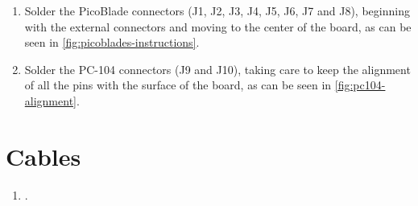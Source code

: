 \begin{enumerate}
    \item Solder the PicoBlade connectors (J1, J2, J3, J4, J5, J6, J7 and J8), beginning with the external connectors and moving to the center of the board, as can be seen in \autoref{fig:picoblades-instructions}.
    \item Solder the PC-104 connectors (J9 and J10), taking care to keep the alignment of all the pins with the surface of the board, as can be seen in \autoref{fig:pc104-alignment}.
\end{enumerate}

\section{Cables}

\begin{enumerate}
    \item .
\end{enumerate}
